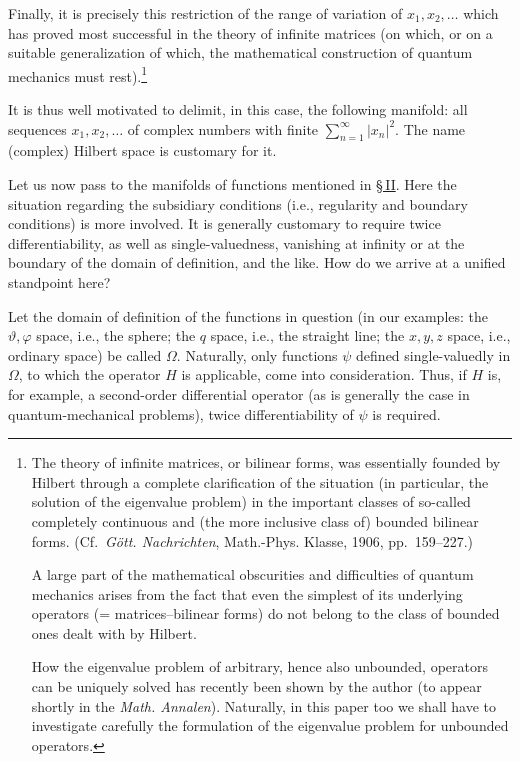 \documentclass[fontsize=13pt,paper=b5,twoside,bookmarkpackage=false]{scrartcl}
\newcommand{\Sec}[1]{\hyperref[sec:#1]{\S\,#1}}
\begin{document}
Finally, it is precisely this restriction of the range of variation of $x_1,x_2,\ldots$ which has proved most successful in the theory of infinite matrices (on which, or on a suitable generalization of which, the mathematical construction of quantum mechanics must rest).\footnote[12]{\label{fn:12}The theory of infinite matrices, or bilinear forms, was essentially founded by Hilbert through a complete clarification of the situation (in particular, the solution of the eigenvalue problem) in the important classes of so-called completely continuous and (the more inclusive class of) bounded bilinear forms. (Cf.\ \emph{Gött. Nachrichten}, Math.-Phys. Klasse, 1906, pp.~159--227.)

A large part of the mathematical obscurities and difficulties of quantum mechanics arises from the fact that even the simplest of its underlying operators (= matrices--bilinear forms) do not belong to the class of bounded ones dealt with by Hilbert.

How the eigenvalue problem of arbitrary, hence also unbounded, operators can be uniquely solved has recently been shown by the author (to appear shortly in the \emph{Math. Annalen}). Naturally, in this paper too we shall have to investigate carefully the formulation of the eigenvalue problem for unbounded operators.}

It is thus well motivated to delimit, in this case, the following manifold: all sequences $x_1,x_2,\ldots$ of complex numbers with finite $\sum_{n=1}^{\infty}|x_n|^2$. The name (complex) Hilbert space is customary for it.

Let us now pass to the manifolds of functions mentioned in \Sec{II}. Here the situation regarding the subsidiary conditions (i.e., regularity and boundary conditions) is more involved. It is generally customary to require twice differentiability, as well as single-valuedness, vanishing at infinity or at the boundary of the domain of definition, and the like. How do we arrive at a unified standpoint here?

Let the domain of definition of the functions in question (in our examples: the $\vartheta,\varphi$ space, i.e., the sphere; the $q$ space, i.e., the straight line; the $x,y,z$ space, i.e., ordinary space) be called $\Omega$. Naturally, only functions $\psi$ defined single-valuedly in $\Omega$, to which the operator $H$ is applicable, come into consideration. Thus, if $H$ is, for example, a second-order differential operator (as is generally the case in quantum-mechanical problems), twice differentiability of $\psi$ is required.
\end{document}
